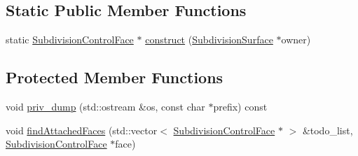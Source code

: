 \subsection*{Static Public Member Functions}
\begin{DoxyCompactItemize}
\item 
static \hyperlink{classShipCAD_1_1SubdivisionControlFace}{Subdivision\+Control\+Face} $\ast$ \hyperlink{classShipCAD_1_1SubdivisionControlFace_a4117f55ab3ec27bebd933f2992bc5dcd}{construct} (\hyperlink{classShipCAD_1_1SubdivisionSurface}{Subdivision\+Surface} $\ast$owner)
\end{DoxyCompactItemize}
\subsection*{Protected Member Functions}
\begin{DoxyCompactItemize}
\item 
void \hyperlink{classShipCAD_1_1SubdivisionControlFace_a224ce57a8d9d631eef63cccd8e0113f9}{priv\+\_\+dump} (std\+::ostream \&os, const char $\ast$prefix) const 
\item 
void \hyperlink{classShipCAD_1_1SubdivisionControlFace_aa6035e53cd1e32a9bd9e9f9800c9f7d4}{find\+Attached\+Faces} (std\+::vector$<$ \hyperlink{classShipCAD_1_1SubdivisionControlFace}{Subdivision\+Control\+Face} $\ast$ $>$ \&todo\+\_\+list, \hyperlink{classShipCAD_1_1SubdivisionControlFace}{Subdivision\+Control\+Face} $\ast$face)
\end{DoxyCompactItemize}

